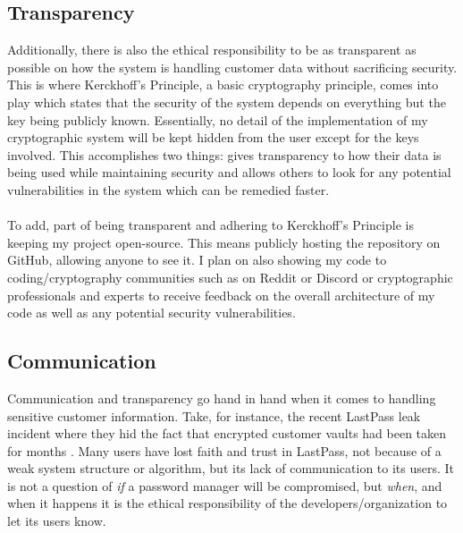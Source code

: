 \documentclass[10pt,twocolumn]{article}
\begin{document}
\subsection{Transparency}
Additionally, there is also the ethical responsibility to be as transparent as possible on how the system is handling customer data without sacrificing security. This is where Kerckhoff's Principle, a basic cryptography principle, comes into play which states that the security of the system depends on everything but the key being publicly known. Essentially, no detail of the implementation of my cryptographic system will be kept hidden from the user except for the keys involved. This accomplishes two things: gives transparency to how their data is being used while maintaining security and allows others to look for any potential vulnerabilities in the system which can be remedied faster\cite{mrdovic2008kerckhoffs}.
\paragraph{}
To add, part of being transparent and adhering to Kerckhoff's Principle is keeping my project open-source. This means publicly hosting the repository on GitHub, allowing anyone to see it. I plan on also showing my code to coding/cryptography communities such as on Reddit or Discord or cryptographic professionals and experts to receive feedback on the overall architecture of my code as well as any potential security vulnerabilities. 
\subsection{Communication}
Communication and transparency go hand in hand when it comes to handling sensitive customer information. Take, for instance, the recent LastPass leak incident where they hid the fact that encrypted customer vaults had been taken for months \cite{clark_2022}. Many users have lost faith and trust in LastPass, not because of a weak system structure or algorithm, but its lack of communication to its users. It is not a question of \emph{if} a password manager will be compromised, but \emph{when}, and when it happens it is the ethical responsibility of the developers/organization to let its users know.
\end{document}
